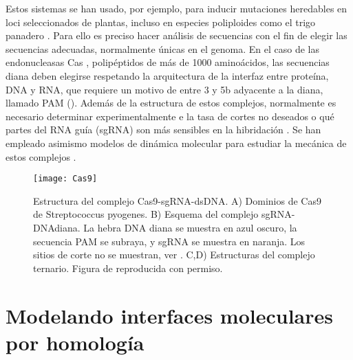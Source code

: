 Estos sistemas se han usado, por ejemplo, para inducir mutaciones heredables en loci seleccionados de plantas, incluso en especies poliploides
como el trigo panadero \citep{Wang2014,Lawrenson2015}. 
Para ello es preciso hacer an\'{a}lisis de secuencias con el fin de elegir las secuencias adecuadas, 
normalmente \'{u}nicas en el genoma. 
En el caso de las endonucleasas Cas \citep{Stella2017}, polip\'{e}ptidos de m\'{a}s de 1000 amino\'{a}cidos,
las secuencias diana deben elegirse respetando la arquitectura 
de la interfaz entre prote\'{i}na, DNA y RNA, que requiere un motivo de entre 3 y 5b adyacente a la diana,
llamado PAM (). Adem\'{a}s de la estructura de estos complejos, 
normalmente es necesario determinar experimentalmente  e  la 
tasa de cortes no deseados o qu\'{e} partes del RNA gu\'{i}a (sgRNA) son m\'{a}s sensibles en la hibridaci\'{o}n \citep{Cisse2012,Zheng2017}.
Se han empleado asimismo modelos de din\'{a}mica molecular para estudiar la mec\'{a}nica de estos complejos \citep{Zheng2017w}.

\begin{figure}
\begin{center} 
\texttt{[image: Cas9]}
\caption%
{
Estructura del complejo Cas9-sgRNA-dsDNA.
A) Dominios de Cas9 de Streptococcus pyogenes. 
B) Esquema del complejo sgRNA-DNAdiana. La hebra DNA diana se muestra en azul oscuro, la secuencia PAM se subraya, y sgRNA se muestra en naranja. 
Los sitios de corte no se muestran, ver \citet{Stella2017}.
C,D) Estructuras del complejo ternario.
Figura de \cite{Jiang2016} reproducida con permiso.
}
\label{fig:Cas}
\end{center}
\end{figure}




\section{Modelando interfaces moleculares por homolog\'{i}a} \label{dockhom}

